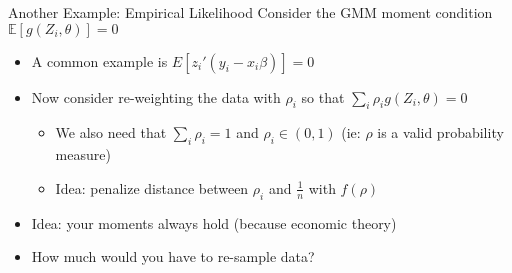 \documentclass[xcolor=pdftex,dvipsnames,table,mathserif,aspectratio=169]{beamer}
\begin{document}

\begin{frame}{Another Example: Empirical Likelihood}
Consider the GMM moment condition $\mathbb{E}[g(Z_i,\theta)]=0$
\begin{itemize}
\item A common example is $E[z_i' (y_i-x_i \beta)]=0$
\item Now consider re-weighting the data with $\rho_i$ so that $\sum_i \rho_i g(Z_i,\theta)=0$
\begin{itemize}
\item We also need that $\sum_i \rho_i =1$ and $\rho_i \in (0,1)$ (ie: $\rho$ is a valid probability measure)
\item Idea: penalize distance between $\rho_i$ and $\frac{1}{n}$ with $f(\rho)$
\end{itemize}
\item Idea: your moments always hold (because economic theory)
\item How much would you have to re-sample data?
\end{itemize}
\end{frame}
\end{document}

